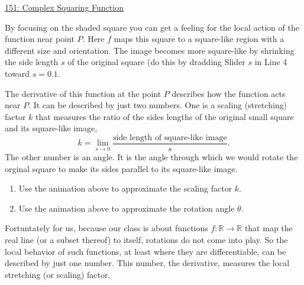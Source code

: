 \documentclass{ximera}
\begin{document}
\begin{onlineOnly}
    \begin{center}
\end{center}
\end{onlineOnly}

\href{https://www.desmos.com/calculator/h4sslgjjyx}{151: Complex Squaring Function}

By focusing on the shaded square you can get a feeling for the local action of the function near point $P$. Here $f$ maps this square to a square-like region with a different size and orientation. The image becomes more square-like by shrinking the side length $s$ of the original square (do this by dradding Slider $s$ in Line 4 toward $s=0.1$.

The derivative of this function at the point $P$ describes how the function acts near $P$. It can be described by just two numbers. One is a scaling (stretching) factor $k$ that measures the ratio of the sides lengths of the original small square and its square-like image, 
\[
         k = \lim_{s\to 0}\frac{\text{side length of square-like image}}{s} .
\]
The other number is an angle. It is the angle through which we would rotate the orginal square to make its sides parallel to its square-like image. 

\begin{question} \label{Q:LDFDFDF}
\begin{enumerate}
\item Use the animation above to approximate the scaling factor $k$.

\item Use the animation above to approximate the rotation angle $\theta$.
\end{enumerate}
\end{question} 

Fortuntately for us, because our class is about functions $f:\mathbb{R}\to \mathbb{R}$ that map the real line (or a subset thereof) to itself, rotations do not come into play. So the local behavior of such functions, at least where they are differentiable, can be described by just one number. This number, the derivative, measures the local stretching (or scaling) factor. 
\end{document}
